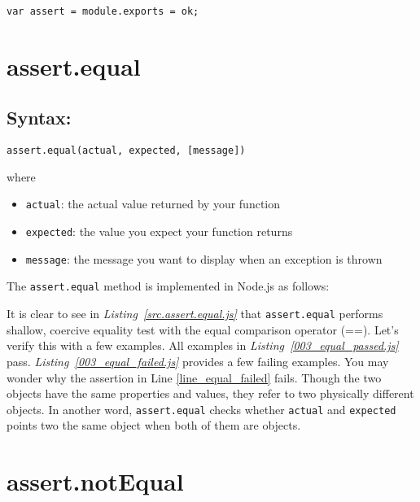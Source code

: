 \lstinline$var assert = module.exports = ok;$
\section{assert.equal}
\label{sec:assert.equal}
\subsection*{Syntax:}
\begin{center}\texttt{assert.equal(actual, expected, [message])}

\end{center}where
\begin{itemize}
\item \texttt{actual}: the actual value returned by your function
\item \texttt{expected}: the value you expect your function returns
\item \texttt{message}: the message you want to display when an exception is thrown
\end{itemize}

The \lstinline$assert.equal$ method is implemented in Node.js as follows:

It is clear to see in \textit{Listing~\ref{src.assert.equal.js}} that \lstinline$assert.equal$ performs shallow, coercive equality test with the equal comparison operator (==). Let's verify this with a few examples.
All examples in \textit{Listing~\ref{003_equal_passed.js}} pass. \textit{Listing~\ref{003_equal_failed.js}} provides a few failing examples. You may wonder why the assertion in Line \ref{line_equal_failed} fails. Though the two objects have the same properties and values, they refer to two physically different objects. In another word, \lstinline$assert.equal$ checks whether 
\lstinline$actual$ and \lstinline$expected$ points two the same object when both of them are objects.
\section{assert.notEqual}
\label{sec:assert.notEqual}
